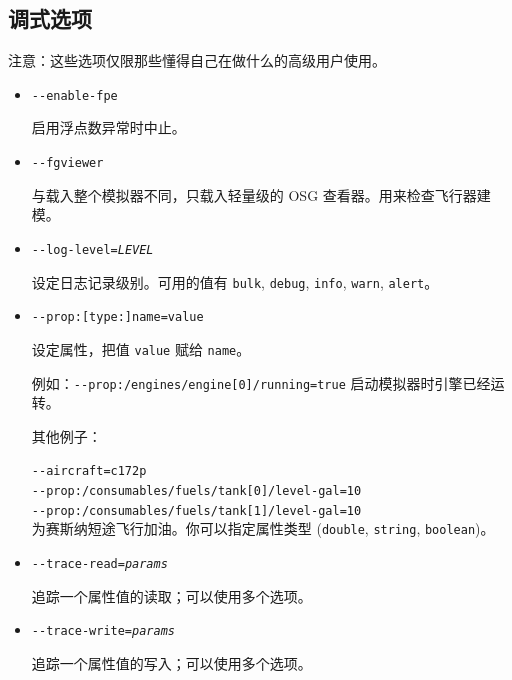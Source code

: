 \ifchinese
{
  \subsection{调式选项}
注意：这些选项仅限那些懂得自己在做什么的高级用户使用。

  \begin{itemize}

  \item{\texttt{-$ $-enable-fpe}}
 
   启用浮点数异常时中止。

  \item{\texttt{-$ $-fgviewer}}
  
   与载入整个模拟器不同，只载入轻量级的 OSG 查看器。用来检查飞行器建模。

  \item{\texttt{-$ $-log-level={\it LEVEL}}}

   设定日志记录级别。可用的值有 \texttt{bulk}, \texttt{debug}, \texttt{info}, \texttt{warn}, \texttt{alert}。

  \item{\texttt{-$ $-prop:[type:]name=value}}

   设定属性，把值 \texttt{value} 赋给  \texttt{name}。

  例如：\texttt{-$ $-prop:/engines/engine[0]/running=true} 启动模拟器时引擎已经运转。

  其他例子：

  \texttt{-$ $-aircraft=c172p}\\
  \texttt{-$ $-prop:/consumables/fuels/tank[0]/level-gal=10}\\
  \texttt{-$ $-prop:/consumables/fuels/tank[1]/level-gal=10}\\

  为赛斯纳短途飞行加油。你可以指定属性类型 (\texttt{double}, \texttt{string}, \texttt{boolean})。

 \item{\texttt{-$ $-trace-read={\it params}}}
  
   追踪一个属性值的读取；可以使用多个选项。

  \item{\texttt{-$ $-trace-write={\it params}}}
   
   追踪一个属性值的写入；可以使用多个选项。
\end{itemize}
}

